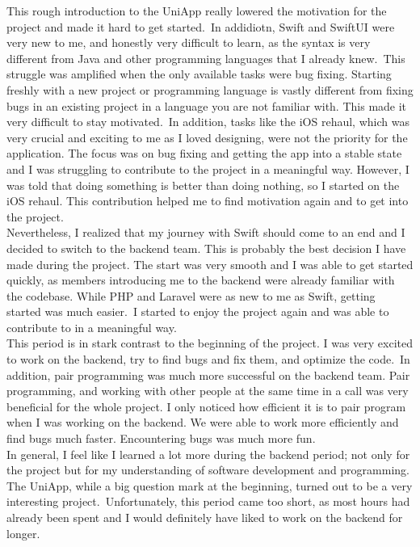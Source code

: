 \documentclass[sf-font,usefira,english]{uulm/sp/article}
\begin{document}
This rough introduction to the UniApp really lowered the motivation for 
the project and made it hard to get started.\
In addidiotn, Swift and SwiftUI were very new to me, and honestly very 
difficult to learn, as the syntax is very different from Java and other programming languages
that I already knew.\
This struggle was amplified when the only available tasks were bug fixing.
Starting freshly with a new project or programming language is vastly different
from fixing bugs in an existing project in a language you are not familiar with.
This made it very difficult to stay motivated.\
In addition, tasks like the iOS rehaul, which was very crucial and exciting to me 
as I loved designing, were not the priority for the application.
The focus was on bug fixing and getting the app into a stable state and 
I was struggling to contribute to the project in a meaningful way.
However, I was told that doing something is better than doing nothing,
so I started on the iOS rehaul.
This contribution helped me to find motivation again and to get into the project.\\

Nevertheless, I realized that my journey with Swift should come to an end
and I decided to switch to the backend team.
This is probably the best decision I have made during the project.
The start was very smooth and I was able to get started quickly,
as members introducing me to the backend were already familiar with the codebase.
While PHP and Laravel were as new to me as Swift, getting started was much easier.\
I started to enjoy the project again and was able to contribute to in a meaningful way.\\

This period is in stark contrast to the beginning of the project.
I was very excited to work on the backend, try to find bugs and fix them,
and optimize the code.\
In addition, pair programming was much more successful on the backend team.
Pair programming, and working with other people at the same time in a call 
was very beneficial for the whole project.
I only noticed how efficient it is to pair program when I was working on the backend.
We were able to work more efficiently and find bugs much faster.
Encountering bugs was much more fun.\\

In general, I feel like I learned a lot more during the backend period;
not only for the project but for my understanding of software development
and programming.
The UniApp, while a big question mark at the beginning,
turned out to be a very interesting project.\
Unfortunately, this period came too short, as most hours had already been spent and
I would definitely have liked to work on the backend for longer.\\
\end{document}
